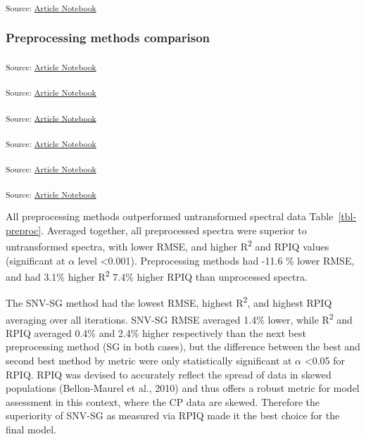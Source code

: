 \documentclass[
]{agujournal2019}
\begin{document}
\textsubscript{Source:
\href{https://rvcrawford.github.io/glowing-system/index.qmd.html}{Article
Notebook}}

\subsubsection{Preprocessing methods
comparison}\label{preprocessing-methods-comparison}

\textsubscript{Source:
\href{https://rvcrawford.github.io/glowing-system/index.qmd.html}{Article
Notebook}}

\textsubscript{Source:
\href{https://rvcrawford.github.io/glowing-system/index.qmd.html}{Article
Notebook}}

\textsubscript{Source:
\href{https://rvcrawford.github.io/glowing-system/index.qmd.html}{Article
Notebook}}

\textsubscript{Source:
\href{https://rvcrawford.github.io/glowing-system/index.qmd.html}{Article
Notebook}}

\textsubscript{Source:
\href{https://rvcrawford.github.io/glowing-system/index.qmd.html}{Article
Notebook}}

\textsubscript{Source:
\href{https://rvcrawford.github.io/glowing-system/index.qmd.html}{Article
Notebook}}

All preprocessing methods outperformed untransformed spectral data
Table~\ref{tbl-preproc}. Averaged together, all preprocessed spectra
were superior to untransformed spectra, with lower RMSE, and higher
R\textsuperscript{2} and RPIQ values (significant at \(\alpha\) level
\textless0.001). Preprocessing methods had -11.6 \% lower RMSE, and had
3.1\% higher R\textsuperscript{2} 7.4\% higher RPIQ than unprocessed
spectra.

The SNV-SG method had the lowest RMSE, highest R\textsuperscript{2}, and
highest RPIQ averaging over all iterations. SNV-SG RMSE averaged 1.4\%
lower, while R\textsuperscript{2} and RPIQ averaged 0.4\% and 2.4\%
higher respectively than the next best preprocessing method (SG in both
cases), but the difference between the best and second best method by
metric were only statistically significant at \(\alpha\) \textless0.05
for RPIQ. RPIQ was devised to accurately reflect the spread of data in
skewed populations (Bellon-Maurel et al., 2010) and thus offers a robust
metric for model assessment in this context, where the CP data are
skewed. Therefore the superiority of SNV-SG as measured via RPIQ made it
the best choice for the final model.
\end{document}
